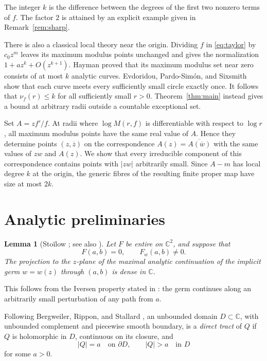 \documentclass[11pt]{article}
\newtheorem{lemma}[theorem]{Lemma}
\theoremstyle{remark}
\numberwithin{equation}{section}
\newcommand{\C}{\mathbb C}
\begin{document}
The integer \(k\) is the difference between the degrees of the first
two nonzero terms of \(f\). The factor \(2\) is attained by an explicit
example given in Remark~\ref{rem:sharp}.

There is also a classical local theory near the origin. Dividing \(f\)
in \eqref{eq:taylor} by \(c_0z^m\) leaves its maximum modulus points
unchanged and gives the normalization \(1+az^k+O(z^{k+1})\).
Hayman \cite[Theorem I(iii), pp.~142--143]{Hayman} proved that its
maximum modulus set near zero consists of at most \(k\) analytic curves.
Evdoridou, Pardo-Sim\'on, and Sixsmith \cite[Theorem 1.4(b)]{EPS}
show that each curve meets every sufficiently small circle exactly once.
It follows that \(\nu_f(r)\le k\) for all sufficiently small \(r>0\).
Theorem~\ref{thm:main} instead gives a bound at arbitrary radii outside
a countable exceptional set.

Set \(A=zf'/f\). At radii where \(\log M(r,f)\) is differentiable
with respect to \(\log r\), all maximum modulus points have the same
real value of \(A\). Hence they determine points \((z,\overline z)\)
on the correspondence \(A(z)=\overline{A(\overline w)}\) with the same
values of \(zw\) and \(A(z)\). We show that every irreducible component
of this correspondence contains points with \(|zw|\) arbitrarily small.
Since \(A-m\) has local degree \(k\) at the origin, the generic fibres
of the resulting finite proper map have size at most \(2k\).

\section{Analytic preliminaries}\label{sec:facts}

\begin{lemma}[Sto\"ilow \cite{Stoilow}; see also \cite{Eremenko}]\label{lem:continuation}
Let \(F\) be entire on \(\C^2\), and suppose that
\[
 F(a,b)=0,\qquad F_w(a,b)\ne0.
\]
The projection to the \(z\)-plane of the maximal analytic continuation
of the implicit germ \(w=w(z)\) through \((a,b)\) is dense in \(\C\).
\end{lemma}

This follows from the Iversen property stated in \cite{Eremenko}:
the germ continues along an arbitrarily small perturbation of any
path from \(a\).

Following Bergweiler, Rippon, and Stallard
\cite[Definition 2.1]{BRS}, an unbounded domain \(D\subset\C\), with
unbounded complement and piecewise smooth boundary, is a
\emph{direct tract} of \(Q\) if \(Q\) is holomorphic in \(D\),
continuous on its closure, and
\[
 |Q|=a\quad\text{on }\partial D,
 \qquad |Q|>a\quad\text{in }D
\]
for some \(a>0\).
\end{document}
